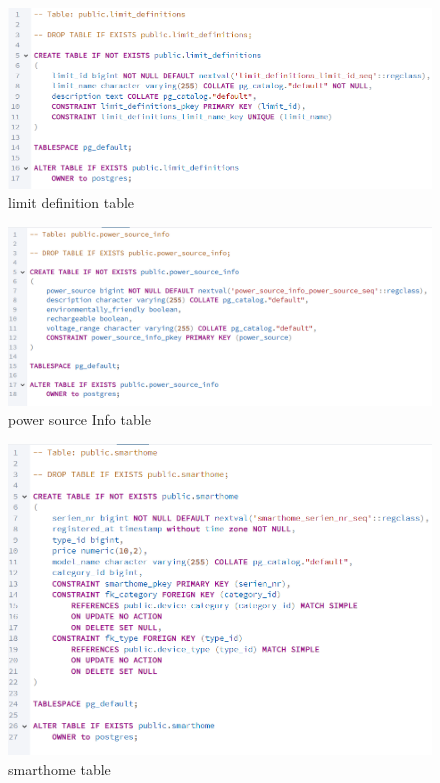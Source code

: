 \documentclass{article}
\begin{document}
\begin{figure}[H]
\centering
\includegraphics[width=\linewidth]{img/limit_definitions.png}
\caption{limit definition table}
\end{figure}


\begin{figure}[H]
\centering
\includegraphics[width=\linewidth]{img/power_source_info.png}
\caption{power source Info table}
\end{figure}

\begin{figure}[H]
\centering
\includegraphics[width=\linewidth]{img/smarthome.png}
\caption{smarthome table}
\end{figure}
\end{document}
